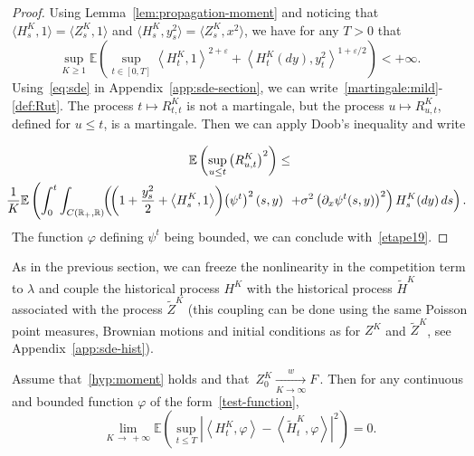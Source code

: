 \documentclass[10pt]{amsart}
\theoremstyle{definition}\newtheorem{defi}[theo]{Definition}\newtheorem{rema}[theo]{Remark}\newtheorem{exam}[theo]{Example}\newtheorem{exem}[theo]{Example}\newtheorem{nota}[theo]{Notation}
\newcommand*\R{\mathbb{R}}
\newcommand*\E{\mathbb{E}}
\begin{document}
\begin{proof}
Using Lemma~\ref{lem:propagation-moment} and noticing that $\langle H^K_s,1\rangle =\langle Z^K_s,1\rangle$ and $\langle H^K_s,y_s^2\rangle =\langle Z^K_s,x^2\rangle$, we have for any $T>0$ that
\begin{equation}\label{etape19}
\sup_{K \geq 1} \E\left(\sup_{t \in [0, T]} \left\langle H^{K}_{t},1\right\rangle^{2+\varepsilon}+\left\langle H^K_t(dy),y_t^2\right\rangle^{1+\varepsilon/2} \right)<+\infty.
\end{equation}
Using~\eqref{eq:sde} in Appendix~\ref{app:sde-section}, we can write~\eqref{martingale:mild}-\eqref{def:Rut}. The process $t\mapsto R^K_{t, t}$ is not a martingale, but the process $u\mapsto R^K_{u, t}$, defined for $u\le t$, is a martingale. Then we can apply Doob's inequality and write

\vspace{-8pt}
\begin{multline*}
\E\left(\sup_{u \le t}\left(R_{u, t}^{K}\right)^2\right)\le
\\
\mkern-10mu \frac{1}{K}\E\left( \int_0^t \int_{C\left(\R_+,\R\right)}\! \!\left(\!\left(1 + \frac{y_s^2}{2} + \left\langle H^K_s,1\right\rangle\right)\!\left(\psi^t\right)^2(s,y)\right.\right.
\left.\left. + \sigma^2 \left(\partial_x \psi^t(s,y)\right)^2\right)H^K_s(dy)\, ds\right).
\end{multline*}
The function $\varphi$ defining $\psi^t$ being bounded, we can conclude with~\eqref{etape19}.
\end{proof}



As in the previous section, we can freeze the nonlinearity in the competition term to $\lambda$ and couple the historical process $H^K$ with the historical process $\widetilde{H}^K$ associated with the process $\widetilde{Z}^K$ (this coupling can be done using the same Poisson point measures, Brownian motions and initial conditions as for $Z^K$ and $\widetilde{Z}^K$, see Appendix~\ref{app:sde-hist}).


\begin{prop}\label{prop:coupligHHtilde}
Assume that~\eqref{hyp:moment} holds and that $\,{Z}^{K}_{0}\xrightarrow[K\to\infty]{w} F\,$. Then for any continuous and bounded function $\varphi$ of the form~\eqref{test-function},
\[
\lim_{K\,\to\,+\infty}\E\left(\sup_{t \le T} \left|\left\langle H^{K}_{t},\varphi\right\rangle-\left\langle\widetilde{H}^{K}_{t},\varphi\right\rangle\right|^2\right) = 0.
\]
\end{prop}
\end{document}
